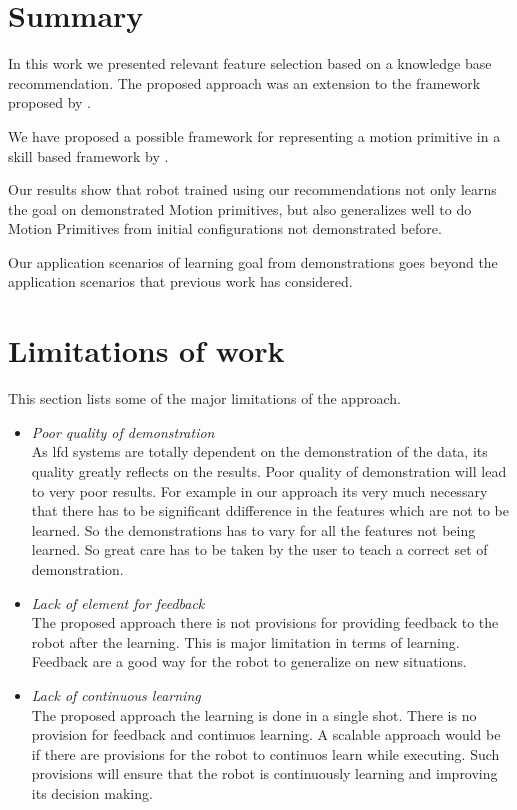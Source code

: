 \section{Summary} 
In this work we presented relevant feature selection based on
a knowledge base recommendation. The proposed approach was an 
extension to the framework proposed by \cite{abdo_inferring_2014}.

We have proposed a possible framework for representing a motion primitive 
in a skill based framework by \cite{pedersen_robot_2015} . 


Our results show that robot trained using our recommendations not only learns
the goal on demonstrated Motion primitives, but also generalizes well to do
Motion Primitives from initial configurations not demonstrated before.

Our application scenarios of learning goal from demonstrations goes beyond the
application scenarios that previous work has considered.

\newpage
\section{Limitations of work}

This section lists some of the major limitations of the approach.
\begin{itemize}
    \item \textit{Poor quality of demonstration} \\
As \acrshort{lfd} systems are totally dependent on the demonstration of the data, its 
quality greatly reflects on the results. Poor quality of demonstration will lead to 
very poor results. For example in our approach its very much necessary that there has 
to be significant ddifference in the features which are not to be learned. So the 
demonstrations has to vary for all the features not being learned. So great care has to 
be taken by the user to teach a correct set of demonstration.

    \item \textit{Lack of element for feedback} \\
The proposed approach there is not provisions for providing feedback to the robot after
the learning. This is major limitation in terms of learning. Feedback are a good way for 
the robot to generalize on new situations.

    \item \textit{Lack of continuous learning} \\
The proposed approach the learning is done in a single shot. There is no provision for 
feedback and continuos learning. A scalable approach would be if there are provisions 
for the robot to continuos learn while executing. Such provisions will ensure that the 
robot is continuously learning and improving its decision making.


\newpage

\end{itemize}
